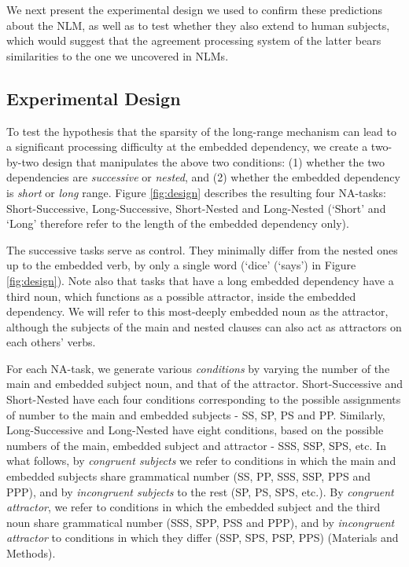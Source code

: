 We next present the experimental design we used to confirm these predictions about the NLM, as well as to test whether they also extend to human subjects, which would suggest that the agreement processing system of the latter bears similarities to the one we uncovered in NLMs.

\subsection{Experimental Design}
To test the hypothesis that the sparsity of the long-range mechanism can lead to a significant processing difficulty at the embedded dependency, we create a two-by-two design that manipulates the above two conditions: (1) whether the two dependencies are \textit{successive} or \textit{nested}, and (2) whether the embedded dependency is \textit{short} or \textit{long} range. 
Figure \ref{fig:design} describes the resulting four NA-tasks: Short-Successive, Long-Successive, Short-Nested and Long-Nested (`Short' and `Long' therefore refer to the length of the embedded dependency only). 

The successive tasks serve as control. They minimally differ from the nested ones up to the embedded verb, by only a single word (`dice' (`says') in Figure \ref{fig:design}). Note also that tasks that have a long embedded dependency have a third noun, which functions as a possible attractor, inside the embedded dependency. We will refer to this most-deeply embedded noun as the attractor, although the subjects of the main and nested clauses can also act as attractors on each others' verbs.

For each NA-task, we generate various \textit{conditions} by varying the number of the main and embedded subject noun, and that of the attractor. Short-Successive and Short-Nested have each four conditions corresponding to the possible assignments of number to the main and embedded subjects - SS, SP, PS and PP. Similarly, Long-Successive and Long-Nested have eight conditions, based on the possible numbers of the main, embedded subject and attractor - SSS, SSP, SPS, etc. In what follows, by \textit{congruent subjects} we refer to conditions in which the main and embedded subjects share grammatical number (SS, PP, SSS, SSP, PPS and PPP), and by \textit{incongruent subjects} to the rest (SP, PS, SPS, etc.). By \textit{congruent attractor}, we refer to conditions in which the embedded subject and the third noun share grammatical number (SSS, SPP, PSS and PPP), and by \textit{incongruent attractor} to conditions in which they differ (SSP, SPS, PSP, PPS) (Materials and Methods).

